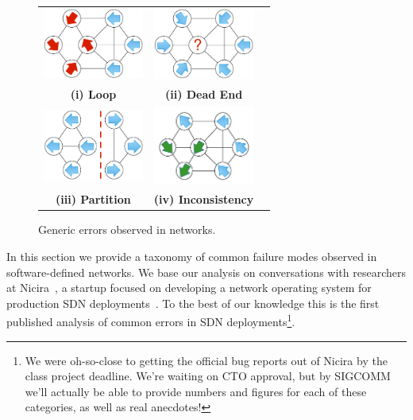 
\begin{figure}[t]
    \centering
    \begin{tabular}{ccc}
    \hspace{-5pt}\includegraphics[width=1.3in]{../diagrams/bugs/loop.pdf}&
    \includegraphics[width=1.3in]{../diagrams/bugs/dead_end.pdf}& \\
    {\bf (i) Loop}&{\bf (ii) Dead End}& \\
    \includegraphics[width=1.3in]{../diagrams/bugs/partition.pdf}&
    \includegraphics[width=1.3in]{../diagrams/bugs/routing_inconsistency.pdf}\\
     {\bf (iii) Partition}&{\bf (iv) Inconsistency}
    \end{tabular}
    \caption[]{\label{fig:generic_errors} Generic errors observed in
    networks.\vspace{-10pt}} 
\end{figure}


In this section we provide a taxonomy of common failure modes observed in
software-defined networks. We base our analysis on conversations with
researchers at Nicira~\cite{nicira}, a startup focused on developing a network operating
system for production SDN deployments~\cite{onix}. To the best of our
knowledge this is the first published analysis of common errors in SDN deployments\footnote{We were oh-so-close to getting the official bug reports out of Nicira by the class project deadline. We're waiting on CTO approval, but by SIGCOMM we'll actually be able to provide numbers and figures for each of these categories, as well as real anecdotes!}. 

